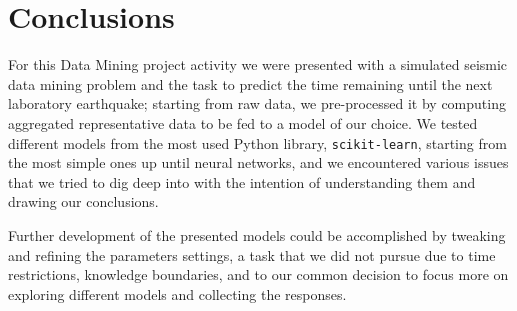\chapter{Conclusions}
\label{conclusioni}
\thispagestyle{empty}

\noindent For this Data Mining project activity we were presented with a simulated seismic data mining problem and the task to predict the time remaining until the next laboratory earthquake; starting from raw data, we pre-processed it by computing aggregated representative data to be fed to a model of our choice. We tested different models from the most used Python library, \texttt{scikit-learn}, starting from the most simple ones up until neural networks, and we encountered various issues that we tried to dig deep into with the intention of understanding them and drawing our conclusions.


Further development of the presented models could be accomplished by tweaking and refining the parameters settings, a task that we did not pursue due to time restrictions, knowledge boundaries, and to our common decision to focus more on exploring different models and collecting the responses.